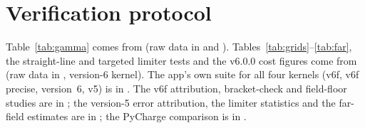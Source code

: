 \documentclass[11pt, a4paper]{article}
\begin{document}
\section{Verification protocol}\label{sec:protocol}
Table~\ref{tab:gamma} comes from  (raw data in  and ). Tables~\ref{tab:grids}--\ref{tab:far}, the straight-line and targeted limiter tests and the v6.0.0 cost figures come from  (raw data in , version-6 kernel). The app's own suite for all four kernels (v6f, v6f precise, version~6, v5) is in . The v6f attribution, bracket-check and field-floor studies are in ; the version-5 error attribution, the limiter statistics and the far-field estimates are in ; the PyCharge comparison is in .
\end{document}
